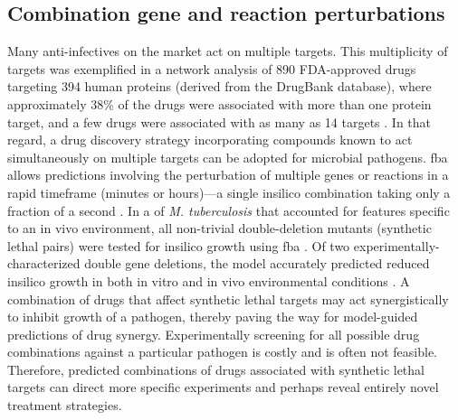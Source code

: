 \subsection{Combination gene and reaction perturbations}
Many anti-infectives on the market act on multiple targets. 
This multiplicity of targets was exemplified in a network 
analysis of 890 FDA-approved drugs targeting 394 human 
proteins (derived from the DrugBank database), where 
approximately 38\% of the drugs were associated with more 
than one protein target, and a few drugs were associated 
with as many as 14 targets \cite{Yildirim:2007hc}. In that regard, a drug 
discovery strategy incorporating compounds known to act 
simultaneously on multiple targets can be adopted for 
microbial pathogens. \gls{fba} allows predictions involving 
the perturbation of multiple genes or reactions in a rapid 
timeframe (minutes or hours)—a single \gls{insilico} combination 
taking only a fraction of a second \cite{Becker:2007cu}. In a  
of \textit{M. tuberculosis} that accounted for features specific to 
an in vivo environment, all non-trivial double-deletion 
mutants (synthetic lethal pairs) were tested for \gls{insilico} 
growth using \gls{fba} \cite{Fang:2010gc}. Of two experimentally-characterized 
double gene deletions, the model accurately predicted reduced 
\gls{insilico} growth in both in vitro and in vivo environmental 
conditions \cite{Fang:2010gc}. A combination of drugs that affect synthetic 
lethal targets may act synergistically to inhibit growth of 
a pathogen, thereby paving the way for model-guided predictions 
of drug synergy. Experimentally screening for all possible 
drug combinations against a particular pathogen is costly 
and is often not feasible. Therefore, predicted combinations 
of drugs associated with synthetic lethal targets can direct 
more specific experiments and perhaps reveal entirely novel 
treatment strategies.

